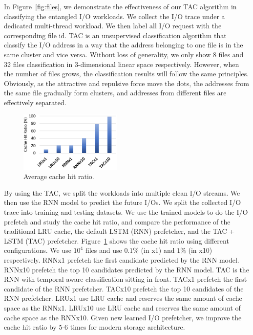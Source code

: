 In Figure~\ref{fig:files}, we demonstrate the effectiveness of our TAC algorithm in classifying the entangled I/O workloads.
We collect the I/O trace under a dedicated multi-thread workload.
We then label all I/O request with the corresponding file id.
TAC is an unsupervised classification algorithm that classify the I/O address
in a way that the address belonging to one file is in the same cluster and vice versa.
Without loss of generality, we only show 8 files and 32 files classification in 3-dimensional linear space respectively.
However, when the number of files grows, the classification results will follow the same principles.
Obviously, as the attractive and repulsive force move the dots, the addresses from the same file gradually form clusters,
and addresses from different files are effectively separated.

\begin{figure}
\centering
\includegraphics[width=0.45\textwidth]{fig/cache.eps}
\caption{Average cache hit ratio.}
\label{fig:cache}
\end{figure}

By using the TAC, we split the workloads into multiple clean I/O streams.
We then use the RNN model to predict the future I/Os.
We split the collected I/O trace into training and testing datasets.
We use the trained models to do the I/O prefetch and study the cache hit ratio,
and compare the performance of the traditional LRU cache,
the default LSTM (RNN) prefetcher, and the TAC + LSTM (TAC) prefetcher.
Figure~\ref{fig:cache} shows the cache hit ratio using different configurations.
We use $10^4$ files and use $0.1\%$ (in x1) and $1\%$ (in x10) respectively.
RNNx1 prefetch the first candidate predicted by the RNN model.
RNNx10 prefetch the top 10 candidates predicted by the RNN model.
TAC is the RNN with temporal-aware classification sitting in front.
TACx1 prefetch the first candidate of the RNN prefetcher.
TACx10 prefetch the top 10 candidates of the RNN prefetcher.
LRUx1 use LRU cache and reserves the same amount of cache space as the RNNx1.
LRUx10 use LRU cache and reserves the same amount of cache space as the RNNx10.
Given new learned I/O prefetcher,
we improve the cache hit ratio by 5-6 times for modern storage architecture.